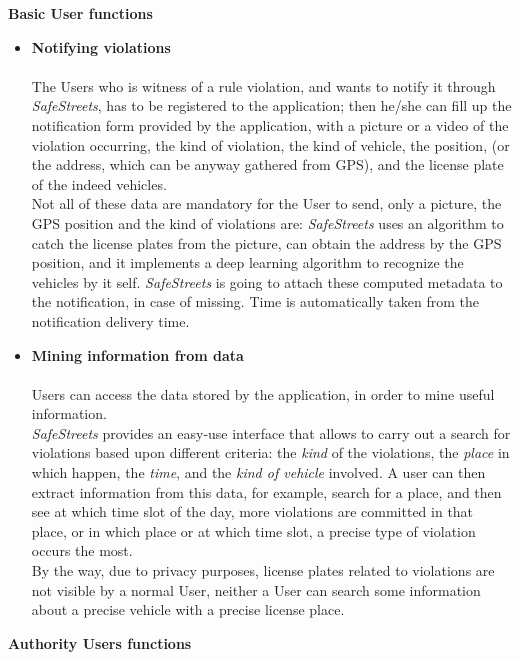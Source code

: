 \textbf{Basic User functions} \\
\begin{itemize}
    \item \textbf{Notifying violations}\\\\
    The Users who is witness of a rule violation, and wants to notify it through \textit{SafeStreets}, has to be registered to the application; then he/she can fill up the notification form provided by the application, with a picture or a video of the violation occurring, the kind of violation, the kind of vehicle, the position, (or the address, which can be anyway gathered from GPS), and the license plate of the indeed vehicles.\\
    Not all of these data are mandatory for the User to send, only a picture, the GPS position and the kind of violations are: \textit{SafeStreets} uses an algorithm to catch the license plates from the picture, can obtain the address by the GPS position, and it implements a deep learning algorithm to recognize the vehicles by it self. \textit{SafeStreets} is going to attach these computed metadata to the notification, in case of missing. Time is automatically taken from the notification delivery time.
    
    \item\textbf{Mining information from data}\\\\
    Users can access the  data stored by the application, in order to mine useful information. \\ \textit{SafeStreets} provides an easy-use interface that allows to  carry out a search for violations based upon different criteria: the \textit{kind} of the violations, the \textit{place} in which happen, the \textit{time}, and the \textit{kind of vehicle} involved. 
    A user can then extract information from this data, for example, search for a place, and then see at which time slot of the day, more violations are committed in that place, or in which place or at which time slot, a precise type of violation occurs the most.\\
    By the way, due to privacy purposes, license plates related to violations are not visible by a normal User, neither a User can search some information about a precise vehicle with a precise license place.
    
    \end{itemize}  
    
    \textbf{Authority Users functions} \\
    

